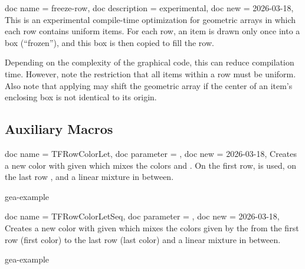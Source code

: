 \documentclass[a4paper,11pt]{article}
\begin{document}
\begin{docGeaKeys}
  {
    {
      doc name        = freeze-row,
      doc description = {experimental},
      doc new         = 2026-03-18,
    }
  }
This is an experimental compile-time optimization for geometric arrays in which
each row contains uniform items. For each row, an item is drawn only once into a
box (\enquote{frozen}), and this box is then copied to fill the row.\par
Depending on the complexity of the graphical code, this can reduce compilation
time. However, note the restriction that all items within a row must be uniform.
Also note that applying  may shift the
geometric array if the center of an item's enclosing box is not identical to its
origin.
\end{docGeaKeys}



\clearpage
\subsection{Auxiliary Macros}

\begin{docCommands}
  {
    {
      doc name      = TFRowColorLet,
      doc parameter = ,
      doc new       = 2026-03-18,
    }
  }
  Creates a new color with given  which mixes the colors
   and . On the first row,  is used,
  on the last row , and a linear mixture in between.

\begin{dispExample*}{gea-example}
\end{dispExample*}
\end{docCommands}



\begin{docCommands}
  {
    {
      doc name      = TFRowColorLetSeq,
      doc parameter = ,
      doc new       = 2026-03-18,
    }
  }
  Creates a new color with given  which mixes the colors
  given by the  from the
  first row (first color) to the last row (last color)
  and a linear mixture in between.

\begin{dispExample*}{gea-example}
\end{dispExample*}
\end{docCommands}
\end{document}
